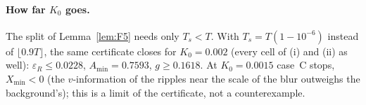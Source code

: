\paragraph*{How far $K_0$ goes.} 
The split of Lemma~\ref{lem:F5} needs only $T_s<T$. With $T_s=T(1-10^{-6})$ instead of $\lfloor0.9T\rfloor$, the same certificate closes for $K_0=0.002$
(every cell of (i) and (ii) as well): $\varepsilon_R\le0.0228$, $A_{\min}=0.7593$, $g\ge0.1618$. At $K_0=0.0015$ case~C stops, $X_{\min}<0$ (the $v$-information of the
ripples near the scale of the blur outweighs the background's); this is a limit of the certificate, not a counterexample.
